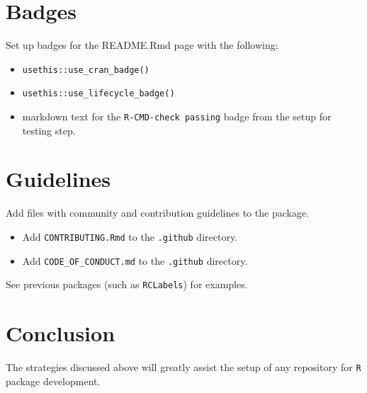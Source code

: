 \documentclass{article}
\begin{document}
\section{Badges}
\label{sec:badges}

Set up badges for the README.Rmd page with the following:

\begin{itemize}
	
  \item \verb|usethis::use_cran_badge()|

  \item \verb|usethis::use_lifecycle_badge()|
  
  \item markdown text for the \verb|R-CMD-check passing| badge from the setup for testing step.

\end{itemize}


\section{Guidelines} 
\label{sec:guidelines}

Add files with community and contribution guidelines to the package.

\begin{itemize}

  \item Add \verb|CONTRIBUTING.Rmd| to the \verb|.github| directory.

  \item Add \verb|CODE_OF_CONDUCT.md| to the \verb|.github| directory.

\end{itemize}
%
See previous packages (such as \verb|RCLabels|) for examples.


\section{Conclusion} 
\label{sec:conclusion}

The strategies discussed above will greatly assist the setup of any repository 
for \texttt{R} package development.




% 
\end{document}
